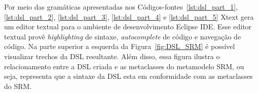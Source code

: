


Por meio das gramáticas apresentadas nos Códigos-fontes~\ref{lst:dsl_part_1}, \ref{lst:dsl_part_2}, \ref{lst:dsl_part_3}, \ref{lst:dsl_part_4} e \ref{lst:dsl_part_5} Xtext gera um editor textual para o ambiente de desenvolvimento Eclipse IDE. Esse editor textual provê \textit{highlighting} de sintaxe, \textit{autocomplete} de código e navegação de código. Na parte superior a esquerda da Figura~\ref{fig:DSL_SRM} é possível visualizar trechos da DSL resultante. Além disso, essa figura ilustra o relacionamento entre a DSL criada e as metaclasses do metamodelo SRM, ou seja, representa que a sintaxe da DSL esta em conformidade com as metaclasses do SRM.

